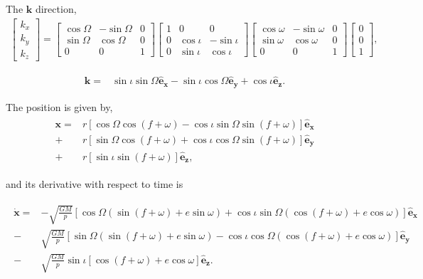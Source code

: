 The $\mathbf{k}$ direction,
\begin{align*}
\begin{bmatrix}
k_x\\
k_y\\
k_z\end{bmatrix}
= 
\begin{bmatrix}
\cos \Omega & -\sin \Omega & 0 \\
\sin \Omega & \cos\Omega & 0\\
0&0&1
\end{bmatrix}
\begin{bmatrix}
1&0&0\\
0&\cos \iota & -\sin \iota \\
0& \sin \iota & \cos\iota 
\end{bmatrix}
\begin{bmatrix}
\cos \omega & -\sin {\omega} & 0 \\
\sin \omega & \cos\omega & 0\\
0&0&1
\end{bmatrix}
\begin{bmatrix}
0\\
0 \\
1\end{bmatrix},
\end{align*}

\begin{align}
	\mathbf{k} =& \sin \iota \sin \Omega  \mathbf{\hat{e}_x}
	 -\sin \iota \cos \Omega \mathbf{\hat{e}_y}
	 + \cos \iota \mathbf{\hat{e}_z}.
\label{eq: kunitary}
\end{align}


The position is given by,
\begin{align}
\begin{split}
	\mathbf{x} =& r [\cos \Omega \cos (f +\omega) - \cos \iota \sin \Omega \sin (f+\omega)] \mathbf{\hat{e}_x}\\
	+&r [\sin \Omega \cos (f +\omega) + \cos \iota \cos \Omega \sin (f+\omega)] \mathbf{\hat{e}_y}\\
	+ & r[ \sin \iota  \sin (f+\omega)] \mathbf{\hat{e}_z},
	\end{split}
\label{eq: xgeneral}
\end{align}

and its derivative with respect to time is

\begin{align}
\begin{split}
	\dot{\mathbf{x}} =&-\sqrt{ \frac{GM}{p}} [\cos \Omega (\sin  (f +\omega) + e \sin \omega) + \cos \iota \sin \Omega  (\cos  (f +\omega) + e \cos \omega)] \mathbf{\hat{e}_x}\\
	-&\sqrt{ \frac{GM}{p}} [\sin \Omega (\sin  (f +\omega) + e \sin \omega) - \cos \iota \cos \Omega  (\cos  (f +\omega) + e \cos \omega)] \mathbf{\hat{e}_y}\\
	- & \sqrt{ \frac{GM}{p}} \sin \iota [  \cos (f+\omega) + e\cos \omega] \mathbf{\hat{e}_z}.
	\end{split}
\label{eq: dotxgeneral}
\end{align}

